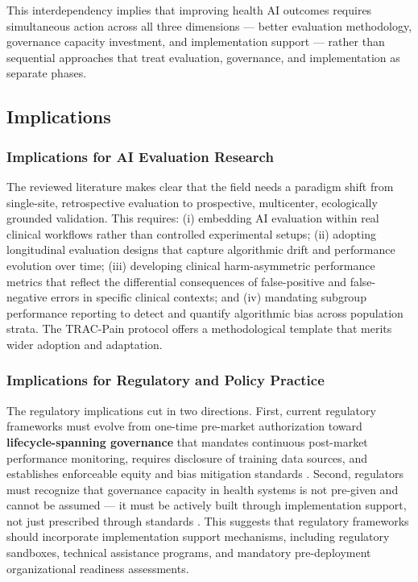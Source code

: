 This interdependency implies that improving health AI outcomes requires
simultaneous action across all three dimensions — better evaluation
methodology, governance capacity investment, and implementation support
— rather than sequential approaches that treat evaluation, governance,
and implementation as separate phases.

\subsection{Implications}
\label{sec:discussion_implications}

\subsubsection{Implications for AI Evaluation Research}

The reviewed literature makes clear that the field needs a paradigm shift
from single-site, retrospective evaluation to prospective, multicenter,
ecologically grounded validation. This requires: (i) embedding AI evaluation
within real clinical workflows rather than controlled experimental setups;
(ii) adopting longitudinal evaluation designs that capture algorithmic drift
and performance evolution over time; (iii) developing clinical harm-asymmetric
performance metrics that reflect the differential consequences of false-positive
and false-negative errors in specific clinical contexts; and (iv) mandating
subgroup performance reporting to detect and quantify algorithmic bias across
population strata. The TRAC-Pain protocol \citep{bailes2026trac} offers a
methodological template that merits wider adoption and adaptation.

\subsubsection{Implications for Regulatory and Policy Practice}

The regulatory implications cut in two directions. First, current regulatory
frameworks must evolve from one-time pre-market authorization toward
\textbf{lifecycle-spanning governance} that mandates continuous post-market
performance monitoring, requires disclosure of training data sources, and
establishes enforceable equity and bias mitigation standards
\citep{abulibdeh2025illusion, warraich2024fda}. Second, regulators must
recognize that governance capacity in health systems is not pre-given and
cannot be assumed — it must be actively built through implementation
support, not just prescribed through standards \citep{tian2026pilottrap}.
This suggests that regulatory frameworks should incorporate implementation
support mechanisms, including regulatory sandboxes, technical assistance
programs, and mandatory pre-deployment organizational readiness assessments.

